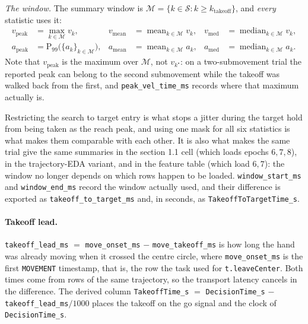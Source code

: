 \documentclass[11pt,a4paper]{article}
\newcommand{\code}[1]{\texttt{\small #1}}
\begin{document}
\emph{The window.} The summary window is
$\mathcal{M} = \{k \in \mathcal{S} : k \ge k_{\text{takeoff}}\}$, and
\emph{every} statistic uses it:
\begin{equation}
  \begin{aligned}
    v_{\text{peak}} &= \max_{k \in \mathcal{M}} v_k, &
    v_{\text{mean}} &= \operatorname{mean}_{k \in \mathcal{M}} v_k, &
    v_{\text{med}} &= \operatorname{median}_{k \in \mathcal{M}} v_k,\\
    a_{\text{peak}} &= \mathrm{P}_{99}\big(\{a_k\}_{k \in \mathcal{M}}\big), &
    a_{\text{mean}} &= \operatorname{mean}_{k \in \mathcal{M}} a_k, &
    a_{\text{med}} &= \operatorname{median}_{k \in \mathcal{M}} a_k .
  \end{aligned}
  \label{eq:summ}
\end{equation}
Note that $v_{\text{peak}}$ is the maximum over $\mathcal{M}$, not $v_{k^\star}$:
on a two-submovement trial the reported peak can belong to the second
submovement while the takeoff was walked back from the first, and
\code{peak\_vel\_time\_ms} records where that maximum actually is.

Restricting the search to target entry is what stops a jitter during the target
hold from being taken as the reach peak, and using one mask for all six
statistics is what makes them comparable with each other. It is also what makes
the same trial give the same summaries in the section 1.1 cell (which loads
epochs $6,7,8$), in the trajectory-EDA variant, and in the feature table (which
load $6,7$): the window no longer depends on which rows happen to be loaded.
\code{window\_start\_ms} and \code{window\_end\_ms} record the window actually
used, and their difference is exported as \code{takeoff\_to\_target\_ms} and,
in seconds, as \code{TakeoffToTargetTime\_s}.

\paragraph{Takeoff lead.} \code{takeoff\_lead\_ms} $=$ \code{move\_onset\_ms}
$-$ \code{move\_takeoff\_ms} is how long the hand was already moving when it
crossed the centre circle, where \code{move\_onset\_ms} is the first
\code{MOVEMENT} timestamp, that is, the row the task used for
\code{t.leaveCenter}. Both times come from rows of the same trajectory, so the
transport latency cancels in the difference. The derived column
\code{TakeoffTime\_s} $=$ \code{DecisionTime\_s} $-$
\code{takeoff\_lead\_ms}$/1000$ places the takeoff on the go signal and the
clock of \code{DecisionTime\_s}.
\end{document}
